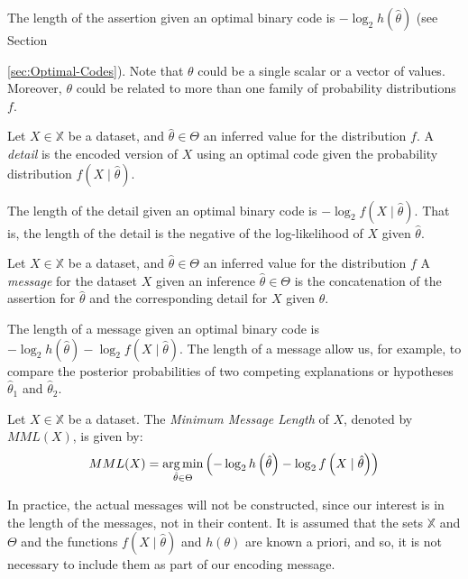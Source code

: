 The length of the assertion given an optimal binary code is $- \log_2 h(\hat\theta)$ (see Section {\ref{sec:Optimal-Codes}). Note that $\theta$ could be a single scalar or a vector of values. Moreover, $\theta$ could be related to more than one family of probability distributions $f$.

\begin{definition}
    Let $X \in \mathbb{X}$ be a dataset, and $\hat \theta \in \Theta$ an inferred value for the distribution $f$. A \emph{detail} is the encoded version of $X$ using an optimal code given the probability distribution $f(X \mid \hat\theta)$.
\end{definition}

The length of the detail given an optimal binary code is $- \log_2 f( X \mid \hat\theta )$. That is, the length of the detail is the negative of the log-likelihood of $X$ given $\hat\theta$.

\begin{definition}
    Let $X \in \mathbb{X}$ be a dataset, and $\hat \theta \in \Theta$ an inferred value for the distribution $f$ A \emph{message} for the dataset $X$ given an inference $\hat\theta \in \Theta$ is the concatenation of the assertion for $\hat\theta$ and the corresponding detail for $X$ given $\theta$.
\end{definition}

The length of a message given an optimal binary code is $- \log_2 h \left( \hat\theta \right) - \log_2 f \left( X \mid \hat\theta \right)$. The length of a message allow us, for example, to compare the posterior probabilities of two competing explanations or hypotheses $\hat\theta_1$ and $\hat\theta_2$.

\begin{definition}
    Let $X \in \mathbb{X}$ be a dataset. The \emph{Minimum Message Length} of $X$, denoted by $MML(X)$, is given by:
    \[
        MML(X) = \operatorname*{arg\,min}_{\hat\theta \in \Theta} \left( - \log_2 h \left( \hat\theta \right) - \log_2 f \left( X \mid \hat\theta \right) \right)
    \]

\end{definition}

In practice, the actual messages will not be constructed, since our interest is in the length of the messages, not in their content. It is assumed that the sets $\mathbb{X}$ and $\Theta$ and the functions $f(X \mid \hat\theta)$ and $h(\theta)$ are known a priori, and so, it is not necessary to include them as part of our encoding message.

}
